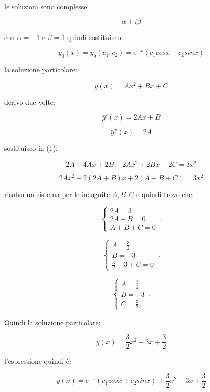 \documentclass[../appunti-analisi.tex]{subfiles}
\begin{document}
le soluzioni sono complesse:

\[
    \alpha \pm  i \beta
\]

con $\alpha = -1$ e $\beta = 1$ quindi sostituisco:

\[
    y_0(x) = y_0(c_1,c_2) = e ^{-x}(c_1cosx + c_2 sinx)
\]

la soluzione particolare:

\[
    \bar{y} (x) = A x^{2}+Bx+C
\]

derivo due volte:

\[
    \bar{y} '(x) = 2Ax + B
\]

\[
    \bar{y} ''(x) = 2A
\]

sostituisco in (1):

\[
    2A + 4Ax + 2B + 2Ax^{2}+2Bx + 2C = 3x^{2}
\]

\[
    2Ax^{2} + 2(2A+B) x + 2(A+B+C) = 3x^{2}
\]

risolvo un sistema per le incognite $A,B,C$ e quindi trovo che:

    \begin{equation}
        \begin{cases}
            2A = 3\\
            2A + B = 0\\
            A+B+C= 0
        \end{cases}\,.
    \end{equation}

    \begin{equation}
        \begin{cases}
            A=\frac{3}{2}\\
            B=-3\\
            \frac{3}{2}-3+C=0
        \end{cases}\,.
    \end{equation}

    \begin{equation}
        \begin{cases}
            A=\frac{3}{2}\\
            B=-3\\
            C=\frac{3}{2}
        \end{cases}\,.
    \end{equation}


Quindi la soluzione particolare:

\[
    \bar{y} (x) = \frac{3}{2}x^{2}-3x+\frac{3}{2}
\]


l'espressione quindi è:

\[
    y(x) = e ^{-x}(c_1 cosx + c_2 sinx ) + \frac{3}{2}x^{2}-3x+\frac{3}{2}
\]
\end{document}
